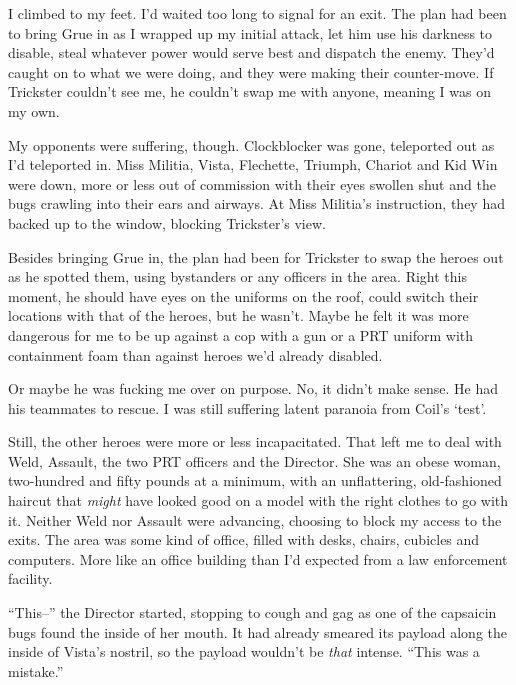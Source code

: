 I climbed to my feet.  I'd waited too long to signal for an exit.  The plan had been to bring Grue in as I wrapped up my initial attack, let him use his darkness to disable, steal whatever power would serve best and dispatch the enemy.  They'd caught on to what we were doing, and they were making their counter-move.  If Trickster couldn't see me, he couldn't swap me with anyone, meaning I was on my own.



My opponents were suffering, though.  Clockblocker was gone, teleported out as I'd teleported in.  Miss Militia, Vista, Flechette, Triumph, Chariot and Kid Win were down, more or less out of commission with their eyes swollen shut and the bugs crawling into their ears and airways.  At Miss Militia's instruction, they had backed up to the window, blocking Trickster's view.



Besides bringing Grue in, the plan had been for Trickster to swap the heroes out as he spotted them, using bystanders or any officers in the area.  Right this moment, he should have eyes on the uniforms on the roof, could switch their locations with that of the heroes, but he wasn't.  Maybe he felt it was more dangerous for me to be up against a cop with a gun or a PRT uniform with containment foam than against heroes we'd already disabled.



Or maybe he was fucking me over on purpose.  No, it didn't make sense.  He had his teammates to rescue.  I was still suffering latent paranoia from Coil's `test'.



Still, the other heroes were more or less incapacitated.  That left me to deal with Weld, Assault, the two PRT officers and the Director.  She was an obese woman, two-hundred and fifty pounds at a minimum, with an unflattering, old-fashioned haircut that \emph{might} have looked good on a model with the right clothes to go with it.  Neither Weld nor Assault were advancing, choosing to block my access to the exits.  The area was some kind of office, filled with desks, chairs, cubicles and computers.  More like an office building than I'd expected from a law enforcement facility.



``This--'' the Director started, stopping to cough and gag as one of the capsaicin bugs found the inside of her mouth.  It had already smeared its payload along the inside of Vista's nostril, so the payload wouldn't be \emph{that} intense.  ``This was a mistake.''



